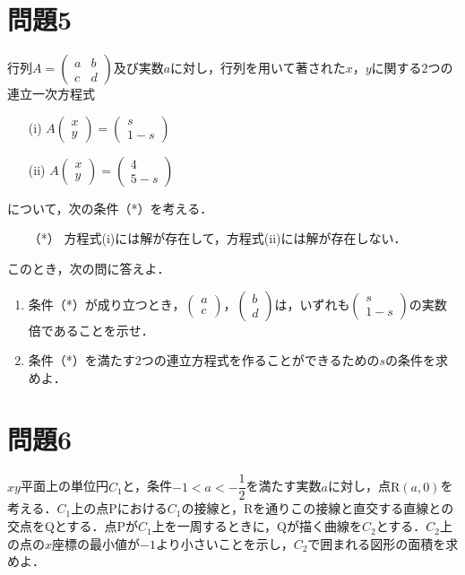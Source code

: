 \documentclass[unicode,12pt, A4j]{ltjsarticle}%
\begin{document}
\section{問題5}
行列$A=\begin{pmatrix}a&b\\ c&d\end{pmatrix}$及び実数$a$に対し，行列を用いて著された$x$，$y$に関する$2$つの連立一次方程式
\begin{itemize}
 \item[(i)] $A\begin{pmatrix} x\\ y\end{pmatrix}=\begin{pmatrix} s\\ 1-s\end{pmatrix}$
 \item[(ii)] $A\begin{pmatrix} x\\ y\end{pmatrix}=\begin{pmatrix} 4\\ 5-s\end{pmatrix}$
\end{itemize}
について，次の条件（*）を考える．
\begin{itemize}
 \item[（*）] 方程式(i)には解が存在して，方程式(ii)には解が存在しない．
\end{itemize}
このとき，次の問に答えよ．
\begin{enumerate}
 \item 条件（*）が成り立つとき，$\begin{pmatrix} a\\ c\end{pmatrix}$，$\begin{pmatrix} b\\ d\end{pmatrix}$は，いずれも$\begin{pmatrix} s\\ 1-s\end{pmatrix}$の実数倍であることを示せ．
 \item 条件（*）を満たす$2$つの連立方程式を作ることができるための$s$の条件を求めよ．
\end{enumerate}

\section{問題6}
$xy$平面上の単位円$C_1$と，条件$-1<a<-\dfrac{1}{2}$を満たす実数$a$に対し，点$\mathrm{R}(a,0)$を考える．$C_1$上の点$\mathrm{P}$における$C_1$の接線と，$\mathrm{R}$を通りこの接線と直交する直線との交点を$\mathrm{Q}$とする．点$\mathrm{P}$が$C_1$上を一周するときに，$\mathrm{Q}$が描く曲線を$C_2$とする．$C_2$上の点の$x$座標の最小値が$-1$より小さいことを示し，$C_2$で囲まれる図形の面積を求めよ．
\end{document}
